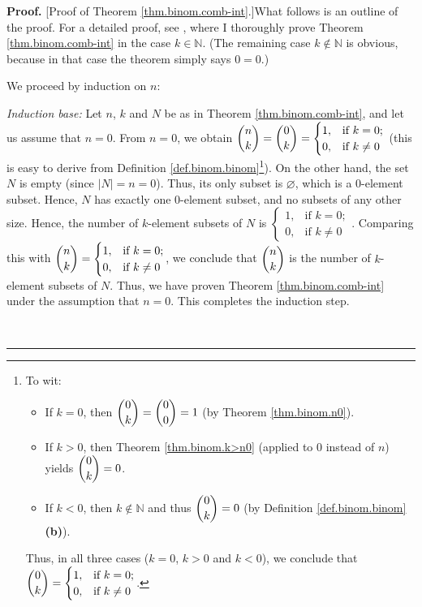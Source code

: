 \documentclass[numbers=enddot,12pt,final,onecolumn,notitlepage]{scrartcl}%
\numberwithin{exer}{subsection}
\theoremstyle{definition}
\newenvironment{proof}[1][Proof]{\noindent\textbf{#1.} }{\ \rule{0.5em}{0.5em}}
\begin{document}
\begin{proof}
[Proof of Theorem \ref{thm.binom.comb-int}.]What follows is an outline of the
proof. For a detailed proof, see \cite[Exercise 3.4]{detnotes}, where I
thoroughly prove Theorem \ref{thm.binom.comb-int} in the case $k\in\mathbb{N}%
$. (The remaining case $k\notin\mathbb{N}$ is obvious, because in that case
the theorem simply says $0=0$.)

We proceed by induction on $n$:

\textit{Induction base:} Let $n$, $k$ and $N$ be as in Theorem
\ref{thm.binom.comb-int}, and let us assume that $n=0$. From $n=0$, we obtain
$\dbinom{n}{k}=\dbinom{0}{k}=%
\begin{cases}
1, & \text{if }k=0;\\
0, & \text{if }k\neq0
\end{cases}
$ (this is easy to derive from Definition \ref{def.binom.binom}\footnote{To
wit:
\par
\begin{itemize}
\item If $k=0$, then $\dbinom{0}{k}=\dbinom{0}{0}=1$ (by Theorem
\ref{thm.binom.n0}).
\par
\item If $k>0$, then Theorem \ref{thm.binom.k>n0} (applied to $0$ instead of
$n$) yields $\dbinom{0}{k}=0$.
\par
\item If $k<0$, then $k\notin\mathbb{N}$ and thus $\dbinom{0}{k}=0$ (by
Definition \ref{def.binom.binom} \textbf{(b)}).
\end{itemize}
\par
Thus, in all three cases ($k=0$, $k>0$ and $k<0$), we conclude that
$\dbinom{0}{k}=%
\begin{cases}
1, & \text{if }k=0;\\
0, & \text{if }k\neq0
\end{cases}
$.}). On the other hand, the set $N$ is empty (since $\left\vert N\right\vert
=n=0$). Thus, its only subset is $\varnothing$, which is a $0$-element subset.
Hence, $N$ has exactly one $0$-element subset, and no subsets of any other
size. Hence, the number of $k$-element subsets of $N$ is $%
\begin{cases}
1, & \text{if }k=0;\\
0, & \text{if }k\neq0
\end{cases}
$. Comparing this with $\dbinom{n}{k}=%
\begin{cases}
1, & \text{if }k=0;\\
0, & \text{if }k\neq0
\end{cases}
$, we conclude that $\dbinom{n}{k}$ is the number of $k$-element subsets of
$N$. Thus, we have proven Theorem \ref{thm.binom.comb-int} under the
assumption that $n=0$. This completes the induction step.


\end{proof}
\end{document}
